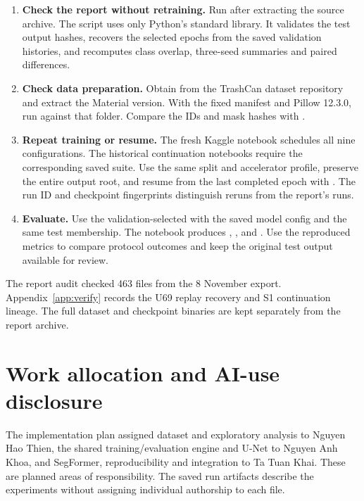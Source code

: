 \begin{enumerate}
\item \textbf{Check the report without retraining.} Run  after extracting the source archive. The script uses only Python's standard library. It validates the test output hashes, recovers the selected epochs from the saved validation histories, and recomputes class overlap, three-seed summaries and paired differences.
\item \textbf{Check data preparation.} Obtain  from the TrashCan dataset repository\cite{trashcandr} and extract the Material version. With the fixed manifest and Pillow 12.3.0, run  against that folder. Compare the IDs and mask hashes with .
\item \textbf{Repeat training or resume.} The fresh Kaggle notebook schedules all nine configurations. The historical continuation notebooks require the corresponding saved suite. Use the same split and accelerator profile, preserve the entire output root, and resume from the last completed epoch with . The run ID and checkpoint fingerprints distinguish reruns from the report's runs.
\item \textbf{Evaluate.} Use the validation-selected  with the saved model config and the same test membership. The notebook produces , ,  and . Use the reproduced metrics to compare protocol outcomes and keep the original test output available for review.
\end{enumerate}
The report audit checked 463 files from the 8 November export. Appendix~\ref{app:verify} records the U69 replay recovery and S1 continuation lineage. The full dataset and checkpoint binaries are kept separately from the report archive.

\section{Work allocation and AI-use disclosure}
The implementation plan assigned dataset and exploratory analysis to Nguyen Hao Thien, the shared training/evaluation engine and U-Net to Nguyen Anh Khoa, and SegFormer, reproducibility and integration to Ta Tuan Khai. These are planned areas of responsibility. The saved run artifacts describe the experiments without assigning individual authorship to each file.

